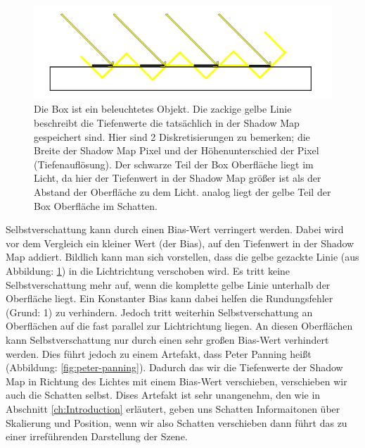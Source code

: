 \begin{figure}[H]
	\begin{center}
    \includegraphics[width=1\textwidth]{res/img/shadow-acne3/image.png}
    \caption{Die Box ist ein beleuchtetes Objekt. 
      Die zackige gelbe Linie beschreibt die Tiefenwerte die tatsächlich in der Shadow Map gespeichert sind.
      Hier sind 2 Diskretisierungen zu bemerken; 
      die Breite der Shadow Map Pixel und der Höhenunterschied der Pixel (Tiefenauflösung).
      Der schwarze Teil der Box Oberfläche liegt im Licht, 
      da hier der Tiefenwert in der Shadow Map größer ist als der Abstand der Oberfläche zu dem Licht.
      analog liegt der gelbe Teil der Box Oberfläche im Schatten.
    }
	\end{center}
	\label{fig:shadow-acne-illu}
\end{figure}

Selbstverschattung kann durch einen Bias-Wert verringert werden.
Dabei wird vor dem Vergleich ein kleiner Wert (der Bias), auf den Tiefenwert in der Shadow Map addiert.
Bildlich kann man sich vorstellen, dass die gelbe gezackte Linie
(aus Abbildung: \ref{fig:shadow-acne-illu}) in die Lichtrichtung verschoben wird.
Es tritt keine Selbstverschattung mehr auf, wenn die komplette gelbe Linie unterhalb der Oberfläche liegt.
\newline \newline
Ein Konstanter Bias kann dabei helfen die Rundungsfehler (Grund: 1) zu verhindern.
Jedoch tritt weiterhin Selbstverschattung an Oberflächen auf die fast parallel zur Lichtrichtung liegen.
An diesen Oberflächen kann Selbstverschattung nur durch einen sehr großen Bias-Wert verhindert werden.
Dies führt jedoch zu einem Artefakt, dass Peter Panning heißt (Abbildung: \ref{fig:peter-panning}).
Dadurch das wir die Tiefenwerte der Shadow Map in Richtung des Lichtes mit einem Bias-Wert verschieben,
verschieben wir auch die Schatten selbst.
Dises Artefakt ist sehr unangenehm, den wie in Abschnitt \ref{ch:Introduction} erläutert, geben uns Schatten Informaitonen
über Skalierung und Position, wenn wir also Schatten verschieben dann führt das zu einer irreführenden Darstellung der Szene.

